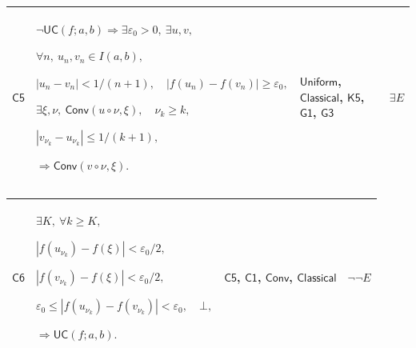 \documentclass[11pt]{amsart}
\newlength{\FTCFourColumnBody}
\begin{document}
{\begin{tabular}
\end{tabular}%
\par\setlength{\parskip}{0pt}\nointerlineskip
\noindent
\begin{tabular}{|@{}>{\centering\arraybackslash}m{0.078431\FTCFourColumnBody}|>{\centering\arraybackslash}m{0.535947\FTCFourColumnBody}|>{\centering\arraybackslash}m{0.281045\FTCFourColumnBody}|>{\centering\arraybackslash}m{0.104575\FTCFourColumnBody}|}\hline
\hypertarget{proof:C5}{$\displaystyle \textsf{C5}$} & $\displaystyle \neg\textsf{UC}(f;a,b)\Rightarrow\exists\varepsilon_0>0,\ \exists u,v,$\par
$\displaystyle \forall n,\ u_n,v_n\in I(a,b),$\par
$\displaystyle |u_n-v_n|<1/(n+1),\quad|f(u_n)-f(v_n)|\ge\varepsilon_0,$\par
$\displaystyle \exists\xi,\nu,\ \textsf{Conv}(u\circ\nu,\xi),\quad\nu_k\ge k,$\par
$\displaystyle |v_{\nu_k}-u_{\nu_k}|\le1/(k+1),$\par
$\displaystyle \Rightarrow\textsf{Conv}(v\circ\nu,\xi).$ & \hyperlink{def:Uniform}{$\displaystyle \textsf{Uniform}$}, \hyperlink{ax:Classical}{$\displaystyle \textsf{Classical}$}, \hyperlink{proof:K5}{$\displaystyle \textsf{K5}$}, \hyperlink{proof:G1}{$\displaystyle \textsf{G1}$}, \hyperlink{proof:G3}{$\displaystyle \textsf{G3}$} & $\displaystyle \exists E$\\ \hline
\end{tabular}%
\par\setlength{\parskip}{0pt}\nointerlineskip
\noindent
\begin{tabular}{|@{}>{\centering\arraybackslash}m{0.078431\FTCFourColumnBody}|>{\centering\arraybackslash}m{0.535947\FTCFourColumnBody}|>{\centering\arraybackslash}m{0.281045\FTCFourColumnBody}|>{\centering\arraybackslash}m{0.104575\FTCFourColumnBody}|}\hline
\hypertarget{proof:C6}{$\displaystyle \textsf{C6}$} & $\displaystyle \exists K,\ \forall k\ge K,$\par
$\displaystyle |f(u_{\nu_k})-f(\xi)|<\varepsilon_0/2,$\par
$\displaystyle |f(v_{\nu_k})-f(\xi)|<\varepsilon_0/2,$\par
$\displaystyle \varepsilon_0\le|f(u_{\nu_k})-f(v_{\nu_k})|<\varepsilon_0,\quad\bot,$\par
$\displaystyle \Rightarrow\textsf{UC}(f;a,b).$ & \hyperlink{proof:C5}{$\displaystyle \textsf{C5}$}, \hyperlink{proof:C1}{$\displaystyle \textsf{C1}$}, \hyperlink{def:Conv}{$\displaystyle \textsf{Conv}$}, \hyperlink{ax:Classical}{$\displaystyle \textsf{Classical}$} & $\displaystyle \neg\neg E$\\ \hline

\end{tabular}}
\end{document}
